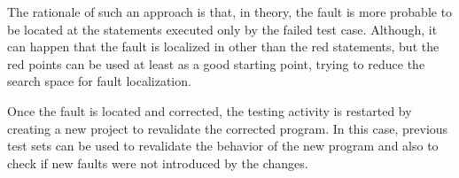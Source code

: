 The rationale of such an approach is that, in theory, the fault is
more probable to be located at the statements executed only by the
failed test case. Although, it can happen that the fault is
localized in other than the red statements, but the red points can
be used at least as a good starting point, trying to reduce the
search space for fault localization.

Once the fault is located and corrected, the testing activity is
restarted by creating a new project to revalidate the corrected
program. In this case, previous test sets can be used to
revalidate the behavior of the new program and also to check if
new faults were not introduced by the changes.


